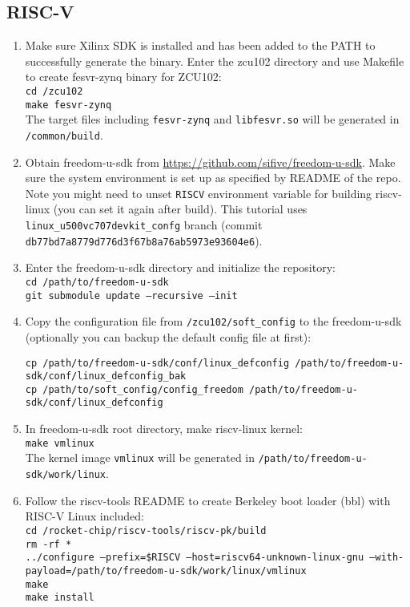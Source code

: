 \documentclass[a4paper,11pt]{article}
\begin{document}
\subsection{RISC-V}
\begin{enumerate}
\item Make sure Xilinx SDK is installed and has been added to the PATH to successfully generate the binary. 
Enter the zcu102 directory and use Makefile to create fesvr-zynq binary for ZCU102:\\
{\tt cd \rootdir/zcu102}\\
{\tt make fesvr-zynq}\\
The target files including \texttt{fesvr-zynq} and \texttt{libfesvr.so} will be generated in \texttt{\rootdir/common/build}.


\item Obtain freedom-u-sdk from \url{https://github.com/sifive/freedom-u-sdk}.
Make sure the system environment is set up as specified by README of the repo. Note you might need to unset \texttt{RISCV} environment variable for building riscv-linux (you can set it again after build). This tutorial uses {\tt linux\_u500vc707devkit\_confg} branch (commit {\tt db77bd7a8779d776d3f67b8a76ab5973e93604e6}).

\item Enter the freedom-u-sdk directory and initialize the repository:\\
\texttt{cd /path/to/freedom-u-sdk}\\
\texttt{git submodule update --recursive --init}

\item Copy the configuration file from {\tt \rootdir/zcu102/soft\_config} to the freedom-u-sdk (optionally you can backup the default config file at first):
\begin{lstlisting}
cp /path/to/freedom-u-sdk/conf/linux_defconfig /path/to/freedom-u-sdk/conf/linux_defconfig_bak
cp /path/to/soft_config/config_freedom /path/to/freedom-u-sdk/conf/linux_defconfig
\end{lstlisting}

\item In freedom-u-sdk root directory, make riscv-linux kernel:\\
{\tt make vmlinux}\\
The kernel image {\tt vmlinux} will be generated in \texttt{/path/to/freedom-u-sdk/work/linux}.

\item Follow the riscv-tools README to create Berkeley boot loader (bbl) with RISC-V Linux included:\\
{\tt cd \rootdir/rocket-chip/riscv-tools/riscv-pk/build\\
rm -rf *\\
../configure --prefix=\$RISCV --host=riscv64-unknown-linux-gnu --with-payload=/path/to/freedom-u-sdk/work/linux/vmlinux\\
make\\
make install}


\end{enumerate}
\end{document}
